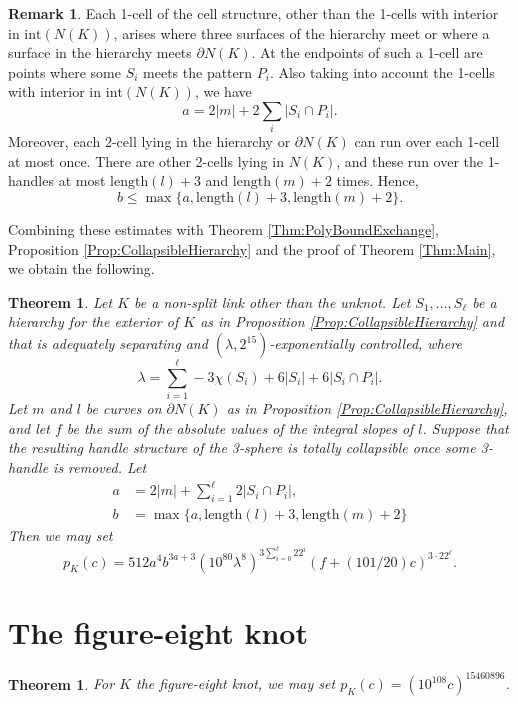 \documentclass[oneside]{amsart}
\numberwithin{equation}{section}
\theoremstyle{plain}
\newtheorem{theorem}[equation]{Theorem}
\theoremstyle{definition}
\newtheorem{remark}[equation]{Remark}
\begin{document}
\begin{remark}
Each 1-cell of the cell structure, other than the 1-cells with interior in $\mathrm{int}(N(K))$, arises where three surfaces of the hierarchy meet
or where a surface in the hierarchy meets $\partial N(K)$.
At the endpoints of such a 1-cell are points where some $S_i$ meets the pattern $P_i$. Also taking into
account the 1-cells with interior in $\mathrm{int}(N(K))$, we have
$$a = 2|m| + 2 \sum_i |S_i \cap P_i|.$$
Moreover, each 2-cell lying in the hierarchy or $\partial N(K)$ can run over each 1-cell at most once. There are
other 2-cells lying in $N(K)$, and these run over the 1-handles at most $\textrm{length}(l) + 3$ and
$\textrm{length}(m) + 2$ times. 
Hence, 
$$b \leq \max \{ a, \textrm{length}(l) + 3, \textrm{length}(m) + 2 \}.$$
\end{remark}

Combining these estimates with Theorem \ref{Thm:PolyBoundExchange}, Proposition \ref{Prop:CollapsibleHierarchy}
and the proof of Theorem \ref{Thm:Main}, we obtain the following.

\begin{theorem}
\label{Thm:CollapsiblePolynomial}
Let $K$ be a non-split link other than the unknot.
Let $S_1, \dots, S_\ell$ be a hierarchy for the exterior of $K$ as in Proposition \ref{Prop:CollapsibleHierarchy}
and that is adequately separating and $(\lambda, 2^{15})$-exponentially controlled, where
$$\lambda = \sum_{i=1}^\ell -3\chi(S_i) + 6 |S_i| + 6|S_i \cap P_i|.$$
Let $m$ and $l$ be curves on $\partial N(K)$ as in Proposition \ref{Prop:CollapsibleHierarchy},
and let $f$ be the sum of the absolute values of the integral slopes of $l$. Suppose that the resulting
handle structure of the 3-sphere is totally collapsible once some 3-handle is removed.
Let
\begin{align*}
a &= 2|m| + \sum_{i=1}^\ell 2|S_i \cap P_i|, \\
b &= \max \{ a, \textrm{length}(l) + 3, \textrm{length}(m) + 2 \}
\end{align*}
Then we may set 
$$p_K(c) = 512a^4b^{3a+3} (10^{80} \lambda^8)^{3 \sum_{i=0}^\ell 22^i} (f + (101/20)c)^{3 \cdot 22^\ell}.$$
\end{theorem}

\section{The figure-eight knot}
\label{Sec:Fig8}

\begin{theorem}
For $K$ the figure-eight knot, we may set $p_K(c) = (10^{108} c)^{15460896}$.
\end{theorem}
\end{document}
